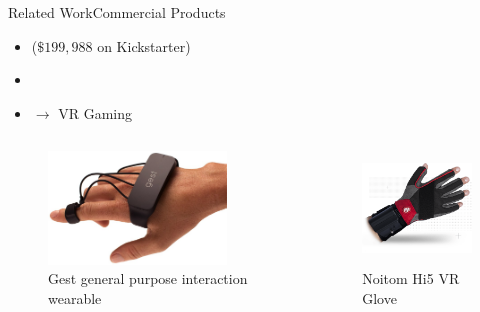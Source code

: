 \begin{frame}{Related Work}{Commercial Products}
    \begin{itemize}
        \item {} \citep{web:gest} {\scriptsize($\text{\$ }199,988$ on Kickstarter)}
        \item {} \citep{web:senseboard}
        \item {} \citep{web:hi5vrglove} $\rightarrow$ VR Gaming
    \end{itemize}
    \begin{columns}[T]
        \begin{column}{0.48\textwidth}
            \begin{figure}
                \includegraphics[height=3cm]{../common/images/gest}
                \caption{Gest general purpose interaction wearable}
            \end{figure}
        \end{column}
        \begin{column}{0.48\textwidth}
            \begin{figure}
                \includegraphics[height=3cm]{../common/images/hi5vr-glove}
                \caption{Noitom Hi5 VR Glove}
            \end{figure}
        \end{column}
    \end{columns}


\end{frame}
